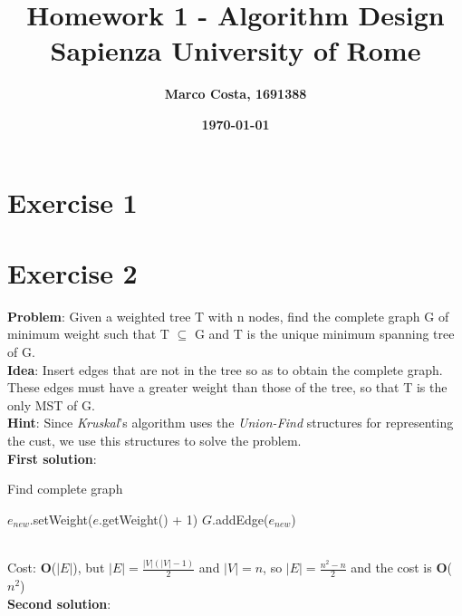 \documentclass[11pt]{article}
\title{\textbf{Homework 1 - Algorithm Design} \\ \bigskip \large \textbf{Sapienza University of Rome}}
\date{\textbf{\today}}
\author{\textbf{Marco Costa, 1691388}}
\begin{document}
\maketitle
\newpage

\section*{Exercise 1}

\newpage

\section*{Exercise 2}
\textbf{Problem}: Given a weighted tree T with n nodes, find the complete graph G of minimum weight such that T $\subseteq$ G and T is the unique minimum spanning tree of G. \\
\textbf{Idea}: 
Insert edges that are not in the tree so as to obtain the complete graph. These edges must have a greater weight than those of the tree, so that T is the only MST of G. \\
\textbf{Hint}: Since \textit{Kruskal}'s algorithm uses the \textit{Union-Find} structures for representing the cust, we use this structures to solve the problem. \\
\textbf{First solution}:
\begin{algorithm}
	\caption{Find complete graph}\label{euclid}
	\begin{algorithmic}[1]
					\State $e_{new}$.setWeight($e$.getWeight() + 1)
					\State $G$.addEdge($e_{new}$)
				\EndIf
			\EndFor		
		\EndFor
	\end{algorithmic}
\end{algorithm}\\
Cost: \textbf{O}($|E|$), but $|E| = \frac{|V|(|V| - 1)}{2}$ and $|V| = n$, so $|E| = \frac{n^2 - n}{2}$ and the cost is \textbf{O}($n^2$) \\
\textbf{Second solution}:

\newpage
\end{document}
